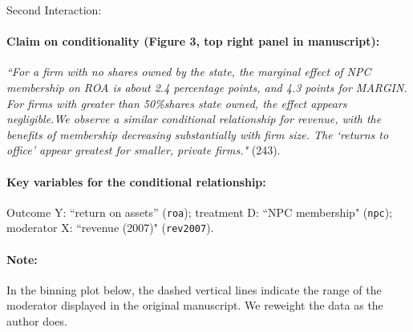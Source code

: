 \documentclass[12pt]{article}
\begin{document}
\clearpage


\noindent Second Interaction:

\paragraph{Claim on conditionality (Figure 3, top right panel in manuscript):} \emph{``For a firm with no shares owned by the state, the marginal effect of NPC membership on ROA is about 2.4 percentage points, and 4.3 points for MARGIN. For firms with greater than 50\%shares state owned, the effect appears negligible.We observe a similar conditional relationship for revenue, with the benefits of membership decreasing substantially with firm size. The `returns to office' appear greatest for smaller, private firms."} (243). 

\paragraph{Key variables for the conditional relationship:} Outcome Y:
``return on assets'' (\texttt{roa}); treatment D: ``NPC membership" (\texttt{npc}); moderator X: ``revenue (2007)"
(\texttt{rev2007}).


\paragraph{Note:} In the binning plot below, the dashed vertical lines
indicate the range of the moderator displayed in the original
manuscript. We reweight the data as the author does.

\newpage
\end{document}

